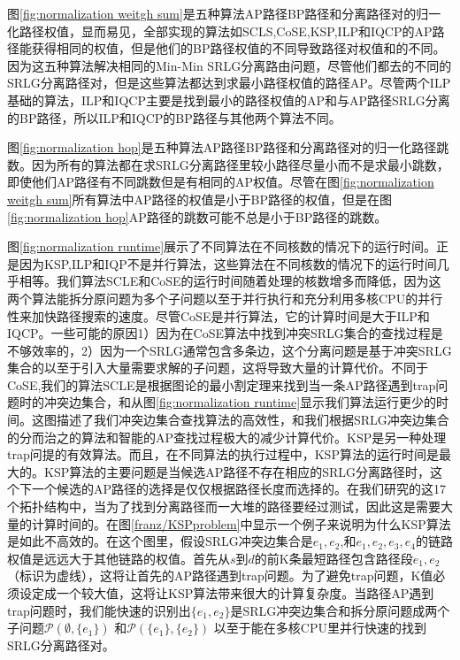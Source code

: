 图\ref{fig:normalization weitgh sum}是五种算法AP路径BP路径和分离路径对的归一化路径权值，显而易见，全部实现的算法如SCLS,CoSE,KSP,ILP和IQCP的AP路径能获得相同的权值，但是他们的BP路径权值的不同导致路径对权值和的不同。因为这五种算法解决相同的Min-Min SRLG分离路由问题，尽管他们都去的不同的SRLG分离路径对，但是这些算法都达到求最小路径权值的路径AP。尽管两个ILP基础的算法，ILP和IQCP主要是找到最小的路径权值的AP和与AP路径SRLG分离的BP路径，所以ILP和IQCP的BP路径与其他两个算法不同。

图\ref{fig:normalization hop}是五种算法AP路径BP路径和分离路径对的归一化路径跳数。因为所有的算法都在求SRLG分离路径里较小路径尽量小而不是求最小跳数，即使他们AP路径有不同跳数但是有相同的AP权值。尽管在图\ref{fig:normalization weitgh sum}所有算法中AP路径的权值是小于BP路径的权值，但是在图\ref{fig:normalization hop}AP路径的跳数可能不总是小于BP路径的跳数。

图\ref{fig:normalization runtime}展示了不同算法在不同核数的情况下的运行时间。正是因为KSP,ILP和IQP不是并行算法，这些算法在不同核数的情况下的运行时间几乎相等。我们算法SCLE和CoSE的运行时间随着处理的核数增多而降低，因为这两个算法能拆分原问题为多个子问题以至于并行执行和充分利用多核CPU的并行性来加快路径搜索的速度。尽管CoSE是并行算法，它的计算时间是大于ILP和IQCP。一些可能的原因1）因为在CoSE算法中找到冲突SRLG集合的查找过程是不够效率的，2）因为一个SRLG通常包含多条边，这个分离问题是基于冲突SRLG集合的以至于引入大量需要求解的子问题，这将导致大量的计算代价。不同于CoSE,我们的算法SCLE是根据图论的最小割定理来找到当一条AP路径遇到trap问题时的冲突边集合，和从图\ref{fig:normalization runtime}显示我们算法运行更少的时间。这图描述了我们冲突边集合查找算法的高效性，和我们根据SRLG冲突边集合的分而治之的算法和智能的AP查找过程极大的减少计算代价。KSP是另一种处理trap问提的有效算法。而且，在不同算法的执行过程中，KSP算法的运行时间是最大的。KSP算法的主要问题是当候选AP路径不存在相应的SRLG分离路径时，这个下一个候选的AP路径的选择是仅仅根据路径长度而选择的。在我们研究的这17个拓扑结构中，当为了找到分离路径而一大堆的路径要经过测试，因此这是需要大量的计算时间的。在图\ref{franz/KSPproblem}中显示一个例子来说明为什么KSP算法是如此不高效的。在这个图里，假设SRLG冲突边集合是$e_1,e_2$,和$e_1,e_2,e_3,e_4$的链路权值是远远大于其他链路的权值。首先从$s$到$d$的前K条最短路径包含路径段$e_1,e_2$（标识为虚线），这将让首先的AP路径遇到trap问题。为了避免trap问题，K值必须设定成一个较大值，这将让KSP算法带来很大的计算复杂度。当路径AP遇到trap问题时，我们能快速的识别出$\{e_1,e_2\}$是SRLG冲突边集合和拆分原问题成两个子问题$\mathcal{P}(\emptyset,\{e_1\})$ 和$\mathcal{P}(\{e_1\},\{e_2\})$
以至于能在多核CPU里并行快速的找到SRLG分离路径对。

